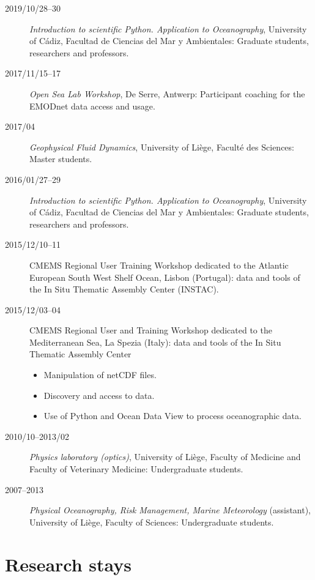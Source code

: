 \documentclass[10pt,a4paper,svgnames]{article}
\begin{document}
\begin{description}

\item[2019/10/28--30] \textit{Introduction to scientific Python. Application to Oceanography}, University of C\'{a}diz, Facultad de Ciencias del Mar y Ambientales: Graduate students, researchers and professors.

\item[2017/11/15--17] \textit{Open Sea Lab Workshop}, De Serre, Antwerp: Participant coaching for the EMODnet data access and usage.

\item[2017/04] \textit{Geophysical Fluid Dynamics}, University of Li\`{e}ge, Facult\'{e} des Sciences: Master students.

\item[2016/01/27--29] \textit{Introduction to scientific Python. Application to Oceanography}, University of C\'{a}diz, Facultad de Ciencias del Mar y Ambientales: Graduate students, researchers and professors.

\item[2015/12/10--11] CMEMS Regional User Training Workshop dedicated to the Atlantic European South West Shelf Ocean, Lisbon (Portugal): data and tools of the In Situ Thematic Assembly Center (INSTAC). 
\item[2015/12/03--04] CMEMS Regional User and Training Workshop dedicated to the Mediterranean Sea, La Spezia (Italy): data and tools of the In Situ Thematic Assembly Center
\begin{itemize}
\item Manipulation of netCDF files.
\item Discovery and access to data.
\item Use of Python and Ocean Data View to process oceanographic data.
\end{itemize}
\item[2010/10--2013/02] \textit{Physics laboratory (optics)}, University of Li\`{e}ge, Faculty of Medicine and Faculty of Veterinary Medicine: Undergraduate students.
\item[2007--2013] \textit{Physical Oceanography, Risk Management, Marine Meteorology} (assistant), University of Li\`{e}ge, Faculty of Sciences: Undergraduate students.

\end{description}


\section{Research stays}
\end{document}
